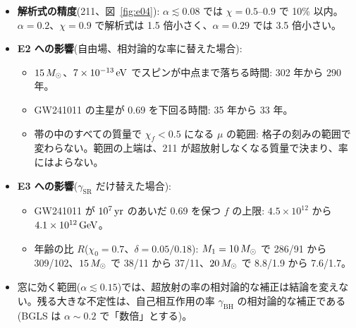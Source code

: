 \begin{result}
\begin{itemize}
\item \textbf{解析式の精度}(211、図~\ref{fig:e04}): $\alpha\lesssim0.08$ では $\chi=0.5$--$0.9$ で 10\% 以内。$\alpha=0.2$、$\chi=0.9$ で解析式は 1.5 倍小さく、$\alpha=0.29$ では 3.5 倍小さい。
\item \textbf{E2 への影響}(自由場、相対論的な率に替えた場合):
  \begin{itemize}
  \item $15\,M_\odot$、$7\times10^{-13}\,\mathrm{eV}$ でスピンが中点まで落ちる時間: 302 年から 290 年。
  \item GW241011 の主星が 0.69 を下回る時間: 35 年から 33 年。
  \item 帯の中のすべての質量で $\chi_f<0.5$ になる $\mu$ の範囲: 格子の刻みの範囲で変わらない。範囲の上端は、211 が超放射しなくなる質量で決まり、率にはよらない。
  \end{itemize}
\item \textbf{E3 への影響}($\gamma_\mathrm{SR}$ だけ替えた場合):
  \begin{itemize}
  \item GW241011 が $10^7\,\mathrm{yr}$ のあいだ 0.69 を保つ $f$ の上限: $4.5\times10^{12}$ から $4.1\times10^{12}\,\mathrm{GeV}$。
  \item 年齢の比 $R$($\chi_0=0.7$、$\delta=0.05/0.18$): $M_1=10\,M_\odot$ で 286/91 から 309/102、$15\,M_\odot$ で 38/11 から 37/11、$20\,M_\odot$ で 8.8/1.9 から 7.6/1.7。
  \end{itemize}
\item 窓に効く範囲($\alpha\lesssim0.15$)では、超放射の率の相対論的な補正は結論を変えない。残る大きな不定性は、自己相互作用の率 $\gamma_\mathrm{BH}$ の相対論的な補正である(BGLS は $\alpha\sim0.2$ で「数倍」とする)。
\end{itemize}
\end{result}

